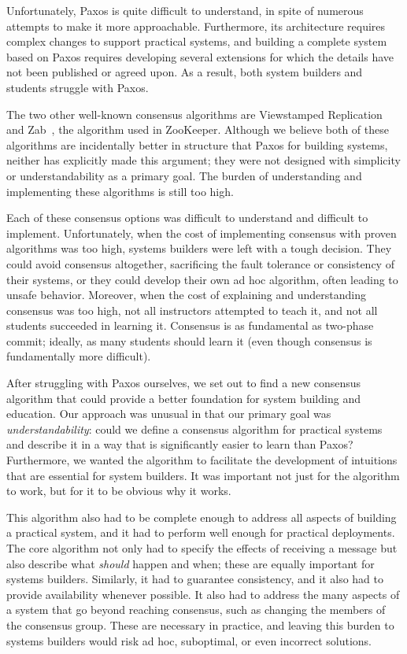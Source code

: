 Unfortunately, Paxos is quite difficult to understand, in spite of
numerous attempts to make it more approachable. Furthermore, its
architecture requires complex changes to support practical systems,
and building a complete system based on Paxos requires developing several
extensions for which the details have not been published or agreed upon. As a
result, both system builders and students struggle with Paxos.

The two other well-known consensus algorithms are Viewstamped
Replication~\cite{Oki:1988,Oki:1988t,Liskov:2012} and
Zab~\cite{Junqueira:2011}, the algorithm used in ZooKeeper. Although we
believe both of these algorithms are incidentally better in structure
that Paxos for building systems, neither has explicitly made this
argument; they were not designed with simplicity or understandability as
a primary goal. The burden of understanding and implementing these
algorithms is still too high.

Each of these consensus options was difficult to understand and
difficult to implement. Unfortunately, when the cost of implementing
consensus with proven algorithms was too high, systems builders were
left with a tough decision. They could avoid consensus altogether,
sacrificing the fault tolerance or consistency of their systems, or they
could develop their own ad hoc algorithm, often leading to
unsafe behavior. Moreover, when the cost of explaining and
understanding consensus was too high, not all instructors attempted to
teach it, and not all students succeeded in learning it. Consensus is as
fundamental as two-phase commit; ideally, as many
students should learn it (even though consensus is fundamentally more
difficult).

After struggling with Paxos ourselves, we set out to find a
new consensus algorithm that could provide a better foundation for
system building and education. Our approach was unusual in that our
primary goal was \emph{understandability}: could we define a consensus
algorithm for practical systems and describe it in a way that is
significantly easier to learn than Paxos? Furthermore, we wanted the
algorithm to facilitate the development of intuitions that are essential
for system builders. It was important not just for the algorithm to
work, but for it to be obvious why it works.

This algorithm also had to be complete enough to address all aspects of
building a practical system, and it had to perform well enough for
practical deployments. The core algorithm not only had to specify the
effects of receiving a message but also describe what \emph{should}
happen and when; these are equally important for systems builders.
Similarly, it had to guarantee consistency, and it also had to provide
availability whenever possible. It also had to address the many aspects
of a system that go beyond reaching consensus, such as changing the
members of the consensus group. These are necessary in practice, and
leaving this burden to systems builders would risk ad hoc, suboptimal,
or even incorrect solutions.


